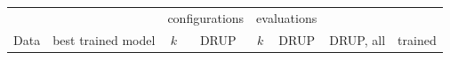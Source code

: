 \begin{tabular}{llcccccc}
\toprule
 & & \multicolumn{2}{c}{configurations} & \multicolumn{2}{c}{evaluations} & & \\
Data & best trained model & $k$ & DRUP & $k$ & DRUP & DRUP, all & trained\\
\midrule
\bottomrule
\end{tabular}
